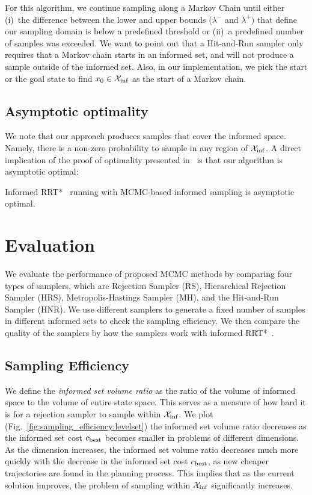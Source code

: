 \documentclass[letterpaper, 10 pt, conference]{ieeeconf}  %
\begin{document}
For this algorithm, we continue sampling along a Markov Chain until either 
(i)~the difference between the lower and upper bounds ($\lambda^-$ and $\lambda^+)$ 
that define our sampling domain is below a predefined threshold or
(ii)~a predefined number of samples was exceeded.
We want to point out that a Hit-and-Run sampler only requires that a Markov chain starts in an informed set, and will not produce a sample outside of the informed set.
Also, in our implementation, we pick the start or the goal state to find $ x_0 \in \mathcal{X}_{\rm {inf}} $ as the start of a Markov chain.



\subsection{Asymptotic optimality}
We note that our approach produces samples that cover the informed space. 
Namely, there is a non-zero probability to sample in any region of $\mathcal{X}_{\rm {inf}}$.
A direct implication of the proof of optimality presented in~\cite{KF11} is that our algorithm is asymptotic optimal:

\begin{prop}
	\label{prop:asym_opt}
	Informed RRT*~\cite{GSB14} running with MCMC-based informed sampling is asymptotic optimal.	
\end{prop}

\section{Evaluation}
\label{sec:eval}

We evaluate the performance of proposed MCMC methods by comparing four types of samplers, which are Rejection Sampler (RS), Hierarchical Rejection Sampler (HRS), Metropolis-Hastings Sampler (MH), and the Hit-and-Run Sampler (HNR).
We use different samplers to generate a fixed number of samples in different informed sets to check the sampling efficiency. %
We then compare the quality of the samplers by how the samplers work with informed RRT*~\cite{GSB14}.

\subsection{Sampling Efficiency}
We define the \emph{informed set volume ratio} as the ratio of the volume of informed space to the volume of entire state space.
This serves as a measure of how hard it is for a rejection sampler to sample within $\mathcal{X}_{\rm {inf}}$.
We plot (Fig.~\ref{fig:sampling_efficiency:levelset}) the informed set volume ratio decreases as the informed set cost $ c_{\rm best} $ becomes smaller in problems of different dimensions.
As the dimension increases, the informed set volume ratio decreases much more quickly with the decrease in the informed set cost $ c_{\rm best} $, as new cheaper trajectories are found in the planning process.
This implies that as the current solution improves, the problem of sampling within $\mathcal{X}_{\rm {inf}}$ significantly increases.
\end{document}
